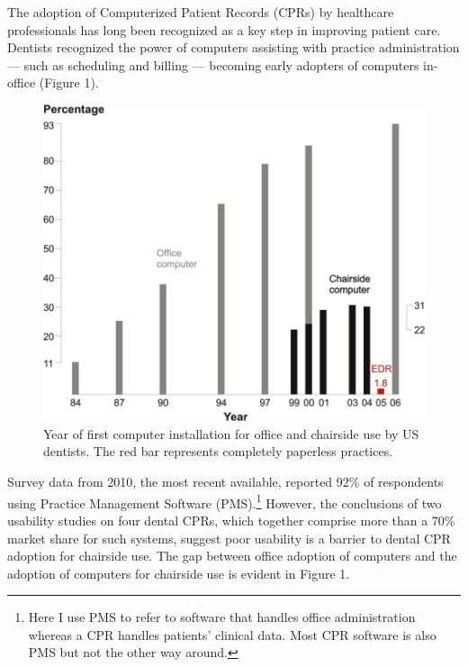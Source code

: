 \documentclass[11pt]{article}
\begin{document}
The adoption of Computerized Patient Records (CPRs) by healthcare professionals has long been recognized as a key step in improving patient care\cite{Chasteen1992A-computer-data,Eisne1993The-computer-ba,Thompson2004The-Decade-of-H,Spicer2008Bytes-and-bites,Schleyer2011Advancing-oral}. Dentists recognized the power of computers assisting with practice administration --- such as scheduling and billing --- becoming early adopters of computers in-office (Figure 1).
\label{fig:1}
\begin{figure}[!h]
\begin{center}
\includegraphics[width=\textwidth]{comp.png}
\end{center}
\caption{Year of first computer installation for office and chairside use by US dentists\cite{Schleyer2006Clinical-Comput}. The red bar represents completely paperless practices.}
\end{figure}
\newpage

\noindent Survey data from 2010, the most recent available, reported 92\% of respondents using Practice Management Software (PMS)\cite{Levine2010}.\footnote[2]{Here I use PMS to refer to software that handles office administration whereas a CPR handles patients' clinical data. Most CPR software is also PMS but not the other way around.} However, the conclusions of two usability studies on four dental CPRs, which together comprise more than a 70\% market share for such systems, suggest poor usability is a barrier to dental CPR adoption for chairside use\cite{Thyvalikakath2007Heuristic-evalu,Thyvalikakath2008A-usability-eva}. The gap between office adoption of computers and the adoption of computers for chairside use is evident in Figure 1.
\end{document}
